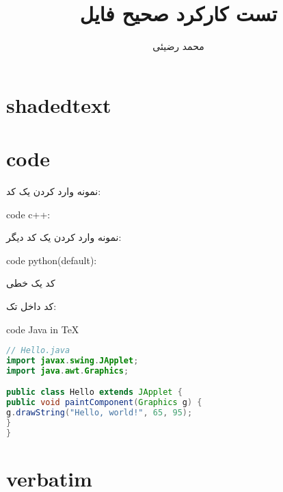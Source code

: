 \documentclass[12pt]{article}
\title{تست کارکرد صحیح فایل}
\author{محمد رضیئی}
\begin{document}
{}
\maketitle

\section{shadedtext}
\ptext[1]
\begin{shadedtext}
	\ptext[1-10]
\end{shadedtext}
\ptext[1]

\section{code}
	نمونه وارد کردن یک کد:

\begin{latin}
\noindent code c++:

\end{latin}	

\newlines



نمونه وارد کردن یک کد دیگر:

	
\begin{latin}
\noindent code python(default):

\end{latin}
کد یک خطی

کد داخل تک:
\begin{latin}
\noindent code Java in \TeX
\begin{lstlisting}[language = Java]
// Hello.java
import javax.swing.JApplet;
import java.awt.Graphics;

public class Hello extends JApplet {
public void paintComponent(Graphics g) {
g.drawString("Hello, world!", 65, 95);
}    
}
\end{lstlisting}
\end{latin}
\currentpagecolor

\section{verbatim} %
\end{document}
